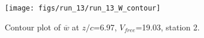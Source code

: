 \begin{figure}[H]
\centering
\texttt{[image: figs/run\_13/run\_13\_W\_contour]}
\caption{Contour plot of $\overline{w}$ at $z/c$=6.97, $V_{free}$=19.03, station 2.}
\label{fig:run_13_W_contour}
\end{figure}


